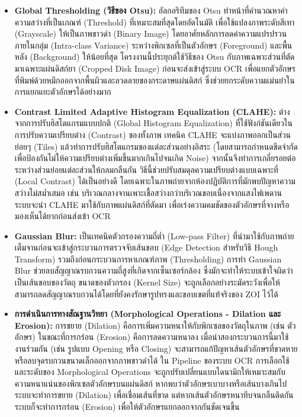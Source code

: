 \begin{itemize}
  \item \textbf{Global Thresholding (วิธีของ Otsu):} อัลกอริทึมของ Otsu ทำหน้าที่คำนวณหาค่าความสว่างที่เป็นเกณฑ์ (Threshold) ที่เหมาะสมที่สุดโดยอัตโนมัติ เพื่อใช้แปลงภาพระดับสีเทา (Grayscale) ให้เป็นภาพขาวดำ (Binary Image) โดยอาศัยหลักการลดค่าความแปรปรวนภายในกลุ่ม (Intra-class Variance) ระหว่างพิกเซลที่เป็นตัวอักษร (Foreground) และพื้นหลัง (Background) ให้น้อยที่สุด โครงงานนี้ประยุกต์ใช้วิธีของ Otsu กับภาพเฉพาะส่วนที่ตัดมาเฉพาะแผ่นดิสก์ยา (Cropped Disk Image) ก่อนจะส่งเข้าสู่ระบบ OCR เพื่อแยกตัวอักษรที่พิมพ์ด้วยหมึกออกจากพื้นผิวและลวดลายของกระดาษแผ่นดิสก์ ซึ่งช่วยยกระดับความแม่นยำในการแยกแยะตัวอักษรได้อย่างมาก

  \item \textbf{Contrast Limited Adaptive Histogram Equalization (CLAHE):} ต่างจากการปรับฮิสโตแกรมแบบปกติ (Global Histogram Equalization) ที่ใช้ฟังก์ชันเดียวในการปรับความเปรียบต่าง (Contrast) ของทั้งภาพ เทคนิค CLAHE จะแบ่งภาพออกเป็นส่วนย่อยๆ (Tiles) แล้วทำการปรับฮิสโตแกรมของแต่ละส่วนอย่างอิสระ (โดยสามารถกำหนดขีดจำกัดเพื่อป้องกันไม่ให้ความเปรียบต่างเพิ่มขึ้นมากเกินไปจนเกิด Noise) จากนั้นจึงทำการเกลี่ยรอยต่อระหว่างส่วนย่อยแต่ละส่วนให้กลมกลืนกัน วิธีนี้ช่วยปรับสมดุลความเปรียบต่างแบบเฉพาะที่ (Local Contrast) ได้เป็นอย่างดี โดยเฉพาะในภาพถ่ายจากห้องปฏิบัติการที่มักพบปัญหาความสว่างไม่สม่ำเสมอ เช่น บริเวณกลางจานเพาะเชื้อสว่างกว่าบริเวณขอบเนื่องจากแสงไฟเพดาน ระบบจะนำ CLAHE มาใช้กับภาพแผ่นดิสก์ที่ตัดมา เพื่อเร่งความคมชัดของตัวอักษรที่จางหรือมองเห็นได้ยากก่อนส่งเข้า OCR

  \item \textbf{Gaussian Blur:} เป็นเทคนิคตัวกรองความถี่ต่ำ (Low-pass Filter) ที่นำมาใช้กับภาพถ่ายเต็มจานก่อนจะเข้าสู่กระบวนการตรวจจับเส้นขอบ (Edge Detection สำหรับวิธี Hough Transform) รวมถึงก่อนกระบวนการหาเกณฑ์ภาพ (Thresholding) การทำ Gaussian Blur ช่วยลบสัญญาณรบกวนความถี่สูงที่เกิดจากเซ็นเซอร์กล้อง ซึ่งมักจะทำให้ระบบเข้าใจผิดว่าเป็นเส้นขอบของวัตถุ ขนาดของตัวกรอง (Kernel Size) จะถูกเลือกอย่างระมัดระวังเพื่อให้สามารถลดสัญญาณรบกวนได้โดยที่ยังคงรักษารูปทรงและขอบเขตที่แท้จริงของ ZOI ไว้ได้

  \item \textbf{การดำเนินการทางสัณฐานวิทยา (Morphological Operations - Dilation และ Erosion):} การขยาย (Dilation) คือการเพิ่มความหนาให้กับพิกเซลของวัตถุในภาพ (เช่น ตัวอักษร) ในขณะที่การกร่อน (Erosion) คือการลดความหนาลง เมื่อนำสองกระบวนการนี้มาใช้งานร่วมกัน (เช่น รูปแบบ Opening หรือ Closing) จะสามารถแก้ปัญหาเส้นตัวอักษรที่ขาดหาย หรือลบจุดรบกวนขนาดเล็กออกจากภาพขาวดำได้ ใน Pipeline ของระบบ OCR การเลือกใช้และระดับของ Morphological Operations จะถูกปรับเปลี่ยนแบบไดนามิกให้เหมาะสมกับความหนาแน่นของพิกเซลตัวอักษรบนแผ่นดิสก์ หากพบว่าตัวอักษรเบาบางหรือเส้นบางเกินไป ระบบจะทำการขยาย (Dilation) เพื่อเชื่อมเส้นที่ขาด แต่หากเส้นตัวอักษรหนาทึบจนกลืนติดกัน ระบบก็จะทำการกร่อน (Erosion) เพื่อให้ตัวอักษรแยกออกจากกันชัดเจนขึ้น


\end{itemize}
